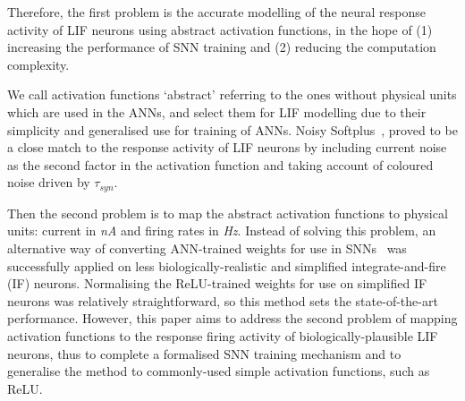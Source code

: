 \documentclass{article}
\begin{document}
	
	Therefore, the first problem is the accurate modelling of the neural response activity of LIF neurons using abstract activation functions, in the hope of (1) increasing the performance of SNN training and (2) reducing the computation complexity.

	We call activation functions `abstract' referring to the ones without physical units which are used in the ANNs, and select them for LIF modelling due to their simplicity and generalised use for training of ANNs.
	Noisy Softplus~\cite{liu2016noisy}, proved to be a close match to the response activity of LIF neurons by including current noise as the second factor in the activation function and taking account of coloured noise driven by $\tau_{syn}$.
	
	
	Then the second problem is to map the abstract activation functions to physical units: current in \textit{nA} and firing rates in \textit{Hz}. 
	Instead of solving this problem, an alternative way of converting ANN-trained weights for use in SNNs~\cite{cao2015spiking,diehl2015fast} was successfully applied 
	on less biologically-realistic and simplified integrate-and-fire (IF) neurons.
	Normalising the ReLU-trained weights for use on simplified IF neurons was relatively straightforward, so this method sets the state-of-the-art performance.
	However, this paper aims to address the second problem of mapping activation functions to the response firing activity of biologically-plausible LIF neurons, thus to complete a formalised SNN training mechanism and to generalise the method to commonly-used simple activation functions, such as ReLU.

	
\end{document}

